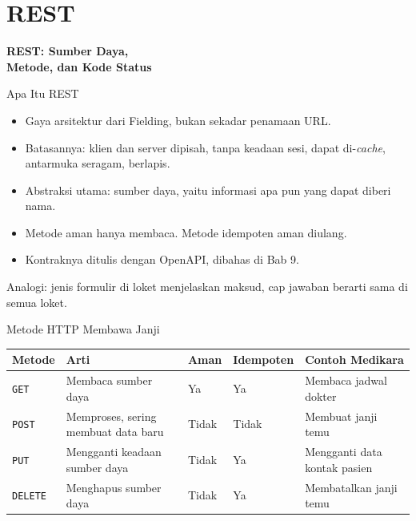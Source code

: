 \documentclass[aspectratio=169, table, 12pt]{beamer}
\begin{document}
\section{REST}

\begin{frame}{\hfill}
  \centering
  \Huge{\textbf{REST: Sumber Daya,\\Metode, dan Kode Status}}
\end{frame}

\begin{frame}{{\Large Apa Itu REST}}
  \vspace{10pt}
  \begin{itemize}
    \item Gaya arsitektur dari Fielding, bukan sekadar penamaan URL.
    \item Batasannya: klien dan server dipisah, tanpa keadaan sesi, dapat di-\textit{cache}, antarmuka seragam, berlapis.
    \item Abstraksi utama: sumber daya, yaitu informasi apa pun yang dapat diberi nama.
    \item Metode aman hanya membaca. Metode idempoten aman diulang.
    \item Kontraknya ditulis dengan OpenAPI, dibahas di Bab 9.
  \end{itemize}
  \vspace{6pt}
  {\small Analogi: jenis formulir di loket menjelaskan maksud, cap jawaban berarti sama di semua loket.}
\end{frame}

\begin{frame}{{\Large Metode HTTP Membawa Janji}}
  \small
  \begin{tabularx}{\textwidth}{>{\raggedright\arraybackslash}p{1.8cm}
      >{\raggedright\arraybackslash}X >{\raggedright\arraybackslash}p{1.3cm}
      >{\raggedright\arraybackslash}p{2.1cm} >{\raggedright\arraybackslash}X}
    \hline
    \textbf{Metode} & \textbf{Arti} & \textbf{Aman} & \textbf{Idempoten} & \textbf{Contoh Medikara} \\ \hline
    \texttt{GET} & Membaca sumber daya & Ya & Ya & Membaca jadwal dokter \\ \hline
    \texttt{POST} & Memproses, sering membuat data baru & Tidak & Tidak & Membuat janji temu \\ \hline
    \texttt{PUT} & Mengganti keadaan sumber daya & Tidak & Ya & Mengganti data kontak pasien \\ \hline
    \texttt{DELETE} & Menghapus sumber daya & Tidak & Ya & Membatalkan janji temu \\ \hline
  \end{tabularx}
\end{frame}
\end{document}
